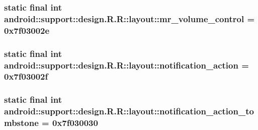 \hypertarget{classandroid_1_1support_1_1design_1_1_r_1_1layout_2a9b2c016ce4cc18b7d0c2cd464825ae}{
\subsubsection[{mr\_\-volume\_\-control}]{\setlength{\rightskip}{0pt plus 5cm}static final int android::support::design.R.R::layout::mr\_\-volume\_\-control = 0x7f03002e}}
\label{classandroid_1_1support_1_1design_1_1_r_1_1layout_2a9b2c016ce4cc18b7d0c2cd464825ae}


\hypertarget{classandroid_1_1support_1_1design_1_1_r_1_1layout_538653e6c0696a083504eab23e60a38e}{
\subsubsection[{notification\_\-action}]{\setlength{\rightskip}{0pt plus 5cm}static final int android::support::design.R.R::layout::notification\_\-action = 0x7f03002f}}
\label{classandroid_1_1support_1_1design_1_1_r_1_1layout_538653e6c0696a083504eab23e60a38e}


\hypertarget{classandroid_1_1support_1_1design_1_1_r_1_1layout_a024e852ac4c0aeb19cc9aba9057335d}{
\subsubsection[{notification\_\-action\_\-tombstone}]{\setlength{\rightskip}{0pt plus 5cm}static final int android::support::design.R.R::layout::notification\_\-action\_\-tombstone = 0x7f030030}}
\label{classandroid_1_1support_1_1design_1_1_r_1_1layout_a024e852ac4c0aeb19cc9aba9057335d}


